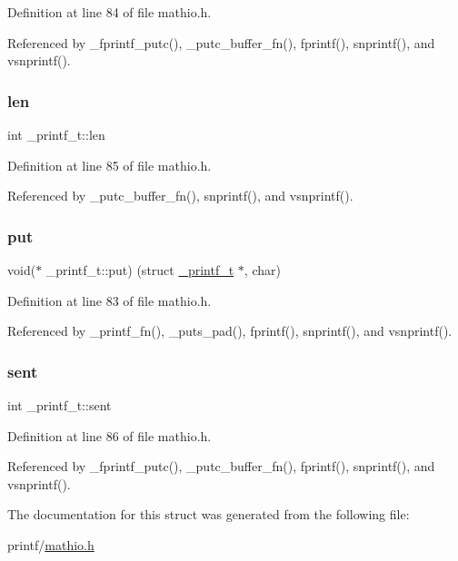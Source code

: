 Definition at line 84 of file mathio.\+h.



Referenced by \+\_\+fprintf\+\_\+putc(), \+\_\+putc\+\_\+buffer\+\_\+fn(), fprintf(), snprintf(), and vsnprintf().

\mbox{\label{struct__printf__t_a5139902cde74159b79e6418a34712bee}} 
\subsubsection{\texorpdfstring{len}{len}}
{\footnotesize\ttfamily int \+\_\+printf\+\_\+t\+::len}



Definition at line 85 of file mathio.\+h.



Referenced by \+\_\+putc\+\_\+buffer\+\_\+fn(), snprintf(), and vsnprintf().

\mbox{\label{struct__printf__t_a3ef8eb0143b93d4446b04c6ce9313be7}} 
\subsubsection{\texorpdfstring{put}{put}}
{\footnotesize\ttfamily void($\ast$ \+\_\+printf\+\_\+t\+::put) (struct \hyperlink{struct__printf__t}{\+\_\+printf\+\_\+t} $\ast$, char)}



Definition at line 83 of file mathio.\+h.



Referenced by \+\_\+printf\+\_\+fn(), \+\_\+puts\+\_\+pad(), fprintf(), snprintf(), and vsnprintf().

\mbox{\label{struct__printf__t_a872716fd701166cd57bd3fffb7b77706}} 
\subsubsection{\texorpdfstring{sent}{sent}}
{\footnotesize\ttfamily int \+\_\+printf\+\_\+t\+::sent}



Definition at line 86 of file mathio.\+h.



Referenced by \+\_\+fprintf\+\_\+putc(), \+\_\+putc\+\_\+buffer\+\_\+fn(), fprintf(), snprintf(), and vsnprintf().



The documentation for this struct was generated from the following file\+:\begin{DoxyCompactItemize}
\item 
printf/\hyperlink{mathio_8h}{mathio.\+h}\end{DoxyCompactItemize}
